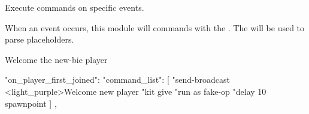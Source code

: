 \label{ch:command_event}

Execute commands on specific events.

When an event occurs, this module will  commands  with the .
The  will be used to parse placeholders.


\begin{example}{Welcome the new-bie player}
    \begin{json}
        "on_player_first_joined": {
            "command_list": [
            "send-broadcast <light_purple>Welcome new player %
            "kit give %
            "run as fake-op %
            "delay 10 spawnpoint %
            ]
        },
    \end{json}
\end{example}
